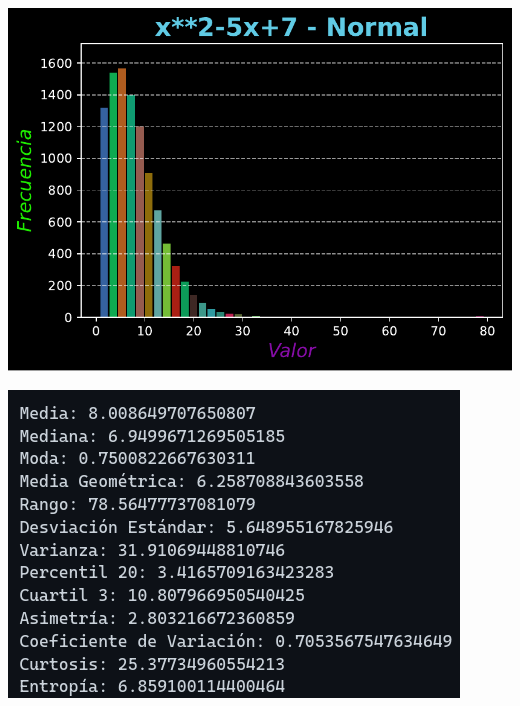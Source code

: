\documentclass[11pt]{article} %
\begin{document}
	\begin{multicols}{2}
		\begin{minipage}{\linewidth}
			\centering
			\includegraphics[width=1\linewidth]{../transformaciones/cuad_normal2.pdf}
			\label{fig:cuadNormHist}
		\end{minipage}
		\vfill\columnbreak
		\begin{minipage}{\linewidth}
			\centering
			\includegraphics[width=1\linewidth]{../transformaciones/cuad_normal3.png}
			\label{cuadNormMet}
		\end{minipage}
	\end{multicols}
	
\end{document}
